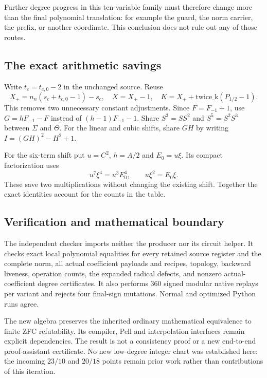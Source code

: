 Further degree progress in this ten-variable family must therefore change
more than the final polynomial translation: for example the guard, the norm
carrier, the prefix, or another coordinate. This conclusion does not rule
out any of those routes.

\subsection{The exact arithmetic savings}
Write $t_c=t_{c,0}-2$ in the unchanged source. Reuse
\[
 X_+=n_n(s_c+t_{c,0}-1)-s_c,
 \quad X=X_+-1,
 \quad K=X_++\mathrm{twice\_k}(P_{1/2}-1).
\]
This removes two unnecessary constant adjustments. Since $F=F_{-1}+1$,
use $G=hF_{-1}-F$ instead of $(h-1)F_{-1}-1$. Share
$S^3=SS^2$ and $S^5=S^2S^3$ between $\Sigma$ and $\Theta$.
For the linear and cubic shifts, share $GH$ by writing
$I=(GH)^2-H^2+1$.

For the six-term shift put $u=C^2$, $h=A/2$ and $E_0=u\xi$. Its compact
factorization uses
\[
 u^7\xi^4=u^3E_0^4,\qquad u\xi^2=E_0\xi.
\]
These save two multiplications without changing the existing shift.
Together the exact identities account for the counts in the table.

\subsection{Verification and mathematical boundary}
The independent checker imports neither the producer nor its circuit
helper. It checks exact local polynomial equalities for every retained
source register and the complete norm, all actual coefficient payloads and
recipes, topology, backward liveness, operation counts, the expanded radical
defects, and nonzero actual-coefficient degree certificates. It also performs
$360$ signed modular native replays per variant and rejects four final-sign
mutations. Normal and optimized Python runs agree.

The new algebra preserves the inherited ordinary mathematical equivalence
to finite ZFC refutability. Its compiler, Pell and interpolation interfaces
remain explicit dependencies. The result is not a consistency proof or a
new end-to-end proof-assistant certificate. No new low-degree integer chart
was established here: the incoming $23/10$ and $20/18$ points remain prior
work rather than contributions of this iteration.
